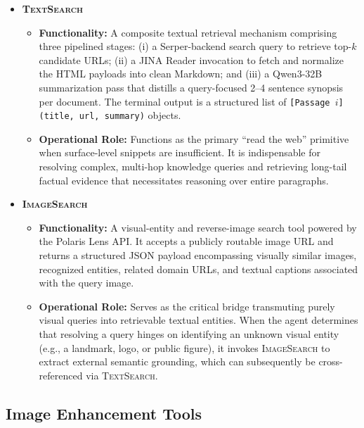 \begin{itemize}[leftmargin=*,itemsep=5pt]

    \item \textbf{\textsc{TextSearch}}
    \begin{itemize}
        \item \textbf{Functionality:} A composite textual retrieval mechanism comprising three pipelined stages: (i) a Serper-backend search query to retrieve top-$k$ candidate URLs; (ii) a JINA Reader invocation to fetch and normalize the HTML payloads into clean Markdown; and (iii) a Qwen3-32B summarization pass that distills a query-focused 2--4 sentence synopsis per document. The terminal output is a structured list of \texttt{[Passage $i$] (title, url, summary)} objects.
        \item \textbf{Operational Role:} Functions as the primary ``read the web'' primitive when surface-level snippets are insufficient. It is indispensable for resolving complex, multi-hop knowledge queries and retrieving long-tail factual evidence that necessitates reasoning over entire paragraphs.
    \end{itemize}

    \item \textbf{\textsc{ImageSearch}}
    \begin{itemize}
        \item \textbf{Functionality:} A visual-entity and reverse-image search tool powered by the Polaris Lens API. It accepts a publicly routable image URL and returns a structured JSON payload encompassing visually similar images, recognized entities, related domain URLs, and textual captions associated with the query image.
        \item \textbf{Operational Role:} Serves as the critical bridge transmuting purely visual queries into retrievable textual entities. When the agent determines that resolving a query hinges on identifying an unknown visual entity (e.g., a landmark, logo, or public figure), it invokes \textsc{ImageSearch} to extract external semantic grounding, which can subsequently be cross-referenced via \textsc{TextSearch}.
    \end{itemize}

\end{itemize}

\subsection*{Image Enhancement Tools}

